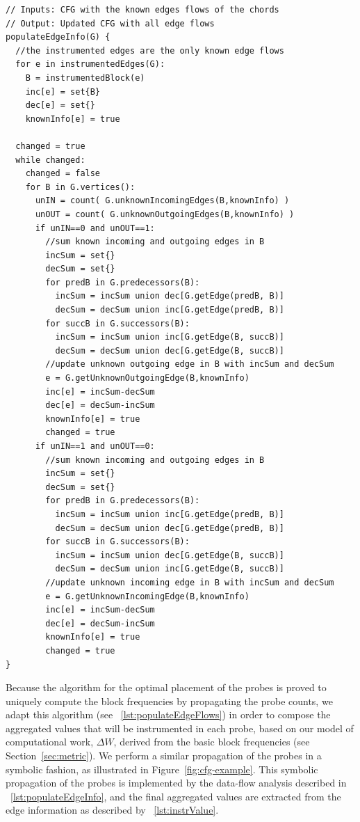 \begin{lstlisting}[caption={Pseudocode of the data-flow analysis for assigning the values computed
  in each probe of the instrumentation for the profiling of the work metric.}, label={lst:populateEdgeInfo}, float]
// Inputs: CFG with the known edges flows of the chords
// Output: Updated CFG with all edge flows
populateEdgeInfo(G) {
  //the instrumented edges are the only known edge flows
  for e in instrumentedEdges(G):
    B = instrumentedBlock(e)
    inc[e] = set{B}
    dec[e] = set{}
    knownInfo[e] = true

  changed = true
  while changed:
    changed = false
    for B in G.vertices():
      unIN = count( G.unknownIncomingEdges(B,knownInfo) )
      unOUT = count( G.unknownOutgoingEdges(B,knownInfo) )
      if unIN==0 and unOUT==1:
        //sum known incoming and outgoing edges in B
        incSum = set{}
        decSum = set{}
        for predB in G.predecessors(B):
          incSum = incSum union dec[G.getEdge(predB, B)]
          decSum = decSum union inc[G.getEdge(predB, B)]
        for succB in G.successors(B):
          incSum = incSum union inc[G.getEdge(B, succB)]
          decSum = decSum union dec[G.getEdge(B, succB)]
        //update unknown outgoing edge in B with incSum and decSum
        e = G.getUnknownOutgoingEdge(B,knownInfo)
        inc[e] = incSum-decSum
        dec[e] = decSum-incSum
        knownInfo[e] = true
        changed = true
      if unIN==1 and unOUT==0:
        //sum known incoming and outgoing edges in B
        incSum = set{}
        decSum = set{}
        for predB in G.predecessors(B):
          incSum = incSum union inc[G.getEdge(predB, B)]
          decSum = decSum union dec[G.getEdge(predB, B)]
        for succB in G.successors(B):
          incSum = incSum union dec[G.getEdge(B, succB)]
          decSum = decSum union inc[G.getEdge(B, succB)]
        //update unknown incoming edge in B with incSum and decSum
        e = G.getUnknownIncomingEdge(B,knownInfo)
        inc[e] = incSum-decSum
        dec[e] = decSum-incSum
        knownInfo[e] = true
        changed = true
}\end{lstlisting}

Because the algorithm for the optimal placement of the probes is proved to uniquely compute the block frequencies by propagating the probe counts, we adapt this algorithm (see \lstlistingname~\ref{lst:populateEdgeFlows}) in order to compose the aggregated values that will be instrumented in each probe, based on our model of computational work, $\Delta W$, derived from the basic block frequencies (see Section~\ref{sec:metric}).
We perform a similar propagation of the probes in a symbolic fashion, as illustrated in Figure~\ref{fig:cfg-example}.
This symbolic propagation of the probes is implemented by the data-flow analysis described in \lstlistingname~\ref{lst:populateEdgeInfo}, and the final aggregated values are extracted from the edge information as described by \lstlistingname~\ref{lst:instrValue}.

